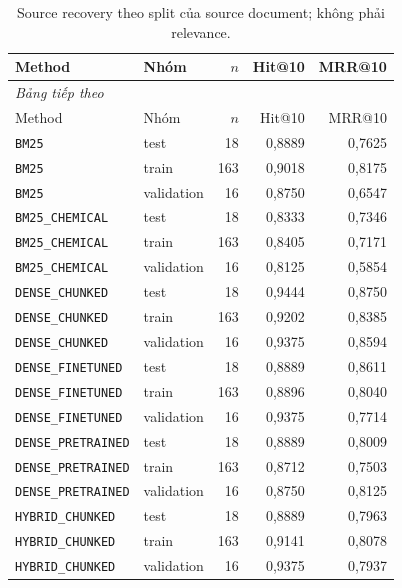 \begingroup{}\footnotesize\setlength{\tabcolsep}{4pt}\renewcommand{\arraystretch}{1.10}
\begin{longtable}{p{.34\linewidth}lrrr}
\caption{Source recovery theo split của source document; không phải relevance.}\label{tab:synthetic-split}\\
\toprule Method & Nhóm & $n$ & Hit@10 & MRR@10 \\
\midrule\endfirsthead
\multicolumn{5}{l}{\textit{Bảng tiếp theo}}\\
\toprule Method & Nhóm & $n$ & Hit@10 & MRR@10 \\
\midrule\endhead
\bottomrule\endfoot
{\footnotesize\texttt{BM25}} & test & 18 & 0,8889 & 0,7625 \\
{\footnotesize\texttt{BM25}} & train & 163 & 0,9018 & 0,8175 \\
{\footnotesize\texttt{BM25}} & validation & 16 & 0,8750 & 0,6547 \\
{\footnotesize\texttt{BM25\_CHEMICAL}} & test & 18 & 0,8333 & 0,7346 \\
{\footnotesize\texttt{BM25\_CHEMICAL}} & train & 163 & 0,8405 & 0,7171 \\
{\footnotesize\texttt{BM25\_CHEMICAL}} & validation & 16 & 0,8125 & 0,5854 \\
{\footnotesize\texttt{DENSE\_CHUNKED}} & test & 18 & 0,9444 & 0,8750 \\
{\footnotesize\texttt{DENSE\_CHUNKED}} & train & 163 & 0,9202 & 0,8385 \\
{\footnotesize\texttt{DENSE\_CHUNKED}} & validation & 16 & 0,9375 & 0,8594 \\
{\footnotesize\texttt{DENSE\_FINETUNED}} & test & 18 & 0,8889 & 0,8611 \\
{\footnotesize\texttt{DENSE\_FINETUNED}} & train & 163 & 0,8896 & 0,8040 \\
{\footnotesize\texttt{DENSE\_FINETUNED}} & validation & 16 & 0,9375 & 0,7714 \\
{\footnotesize\texttt{DENSE\_PRETRAINED}} & test & 18 & 0,8889 & 0,8009 \\
{\footnotesize\texttt{DENSE\_PRETRAINED}} & train & 163 & 0,8712 & 0,7503 \\
{\footnotesize\texttt{DENSE\_PRETRAINED}} & validation & 16 & 0,8750 & 0,8125 \\
{\footnotesize\texttt{HYBRID\_CHUNKED}} & test & 18 & 0,8889 & 0,7963 \\
{\footnotesize\texttt{HYBRID\_CHUNKED}} & train & 163 & 0,9141 & 0,8078 \\
{\footnotesize\texttt{HYBRID\_CHUNKED}} & validation & 16 & 0,9375 & 0,7937 \\

\end{longtable}
